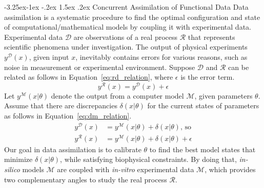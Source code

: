\documentclass[11pt]{article}
\makeatletter
\renewcommand\subsection{\@startsection{subsection}{2}{\z@}%
                                     {-3.25ex\@plus -1ex \@minus -.2ex}%
                                     {1.5ex \@plus .2ex}%
                                     {\normalfont\fontfamily{phv}\fontsize{14}{17}\bfseries}}
\makeatother
\begin{document}
\subsection{Concurrent Assimilation of Functional Data}
Data assimilation is a systematic procedure to find the optimal configuration and state of computational/mathematical models by coupling it with experimental data. Experimental data $\mathcal{D}$ are observations of a real process $\mathcal{R}$ that represents scientific phenomena under investigation. The output of physical experiments $y^{\mathcal{D}}(x)$, given input $x$, inevitably contains errors for various reasons, such as noise in measurement or experimental environment. Suppose $\mathcal{D}$ and $\mathcal{R}$ can be related as follows in Equation~\ref{eq:rd_relation}, where $\epsilon$ is the error term. 
\begin{equation}
    \label{eq:rd_relation}
    y^{\mathcal{R}}(x) = y^{\mathcal{D}}(x) + \epsilon
\end{equation}
Let $y^{\mathcal{M}}(x|\theta)$ denote the output from a computer model $\mathcal{M}$, given parameters $\theta$. Assume that there are discrepancies $\delta(x|\theta)$ for the current states of parameters as follows in Equation~\ref{eq:dm_relation}. 
\begin{align}
    \label{eq:dm_relation}
    y^{\mathcal{D}}(x) &= y^{\mathcal{M}}(x|\theta) + \delta(x|\theta) \text{, so} \\
    y^{\mathcal{R}}(x) &= y^{\mathcal{M}}(x|\theta) + \delta(x|\theta) + \epsilon
\end{align}
Our goal in data assimilation is to calibrate $\theta$ to find the best model states that minimize $\delta(x|\theta)$, while satisfying biophysical constraints. By doing that, \textit{in-silico} models $\mathcal{M}$ are coupled with \textit{in-vitro} experimental data $\mathcal{M}$, which provides two complementary angles to study the real process $\mathcal{R}$.
\end{document}
